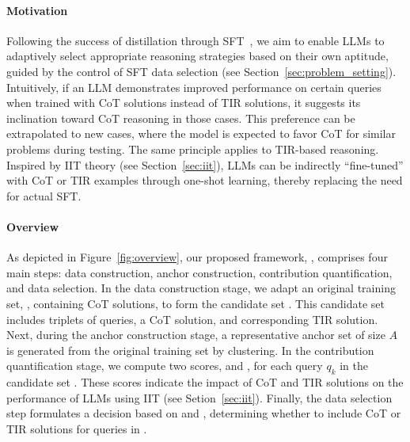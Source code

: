 \paragraph{Motivation}
Following the success of distillation through SFT~\citep{s12025muennighoff, deepseekr12025deepseekai}, we aim to enable LLMs to adaptively select appropriate reasoning strategies based on their own aptitude, guided by the control of SFT data selection (see Section~\ref{sec:problem_setting}). 
Intuitively, if an LLM demonstrates improved performance on certain queries when trained with CoT solutions instead of TIR solutions, it suggests its inclination toward CoT reasoning in those cases.
This preference can be extrapolated to new cases, where the model is expected to favor CoT for similar problems during testing. 
The same principle applies to TIR-based reasoning.
Inspired by IIT theory (see Section~\ref{sec:iit}), LLMs can be indirectly ``fine-tuned'' with CoT or TIR examples through one-shot learning, thereby replacing the need for actual SFT.



\paragraph{Overview}
As depicted in Figure~\ref{fig:overview}, our proposed framework, {\method}, comprises four main steps: data construction, anchor construction, contribution quantification, and data selection. 
In the data construction stage, we adapt an original training set, {\dorig}, containing CoT solutions, to form the candidate set {\dde}. 
This candidate set includes triplets of queries, a CoT solution, and corresponding TIR solution.
Next, during the anchor construction stage, a representative anchor set of size $A$ is generated from the original training set by clustering.
In the contribution quantification stage, we compute two scores, {\scote} and {\stire}, for each query $q_k$ in the candidate set {\dde}. 
These scores indicate the impact of CoT and TIR solutions on the performance of LLMs using IIT (see Setion~\ref{sec:iit}).
Finally, the data selection step formulates a decision based on {\scote} and {\stire}, determining whether to include CoT or TIR solutions for queries in {\dd}.

